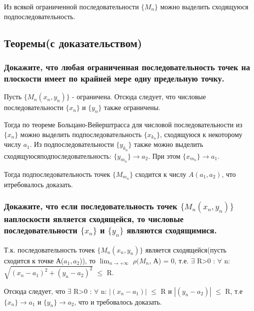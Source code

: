 \documentclass[a4paper, 12pt]{article}
\def\newline{}%
\begin{document}
            Из всякой ограниченной последовательности $\{M_n\}$ можно выделить сходящуюся\newline
            подпоследовательность.
        \subsection{Теоремы(с доказательством)}
            \subsubsection{Докажите, что любая ограниченная последовательность точек на плоскости
            имеет по крайней мере одну предельную точку.}

            Пусть $\{M_n(x_n, y_n)\}$ - ограничена. Отсюда следует, что числовые последовательности $\{x_n\}$ и 
            $\{y_n\}$ также ограничены.

            Тогда по теореме Больцано-Вейерштрасса для числовой последовательности из\newline $\{x_n\}$ можно выделить
            подпоследовательность $\{x_{k_n}\}$, сходящуюся к некоторому числу $a_1$. Из подпоследовательности
            $\{y_{k_n}\}$ также можно выделить сходящуюся\newline подпоследовательность: $\{y_{m_n}\} \rightarrow a_2$.
            При этом $\{x_{m_n}\} \rightarrow a_1$.

            Тогда подпоследовательность точек $\{M_{m_n}\}$ сходится к числу $A(a_1, a_2)$, что и\newline требовалось доказать.

            \subsubsection{Докажите, что если последовательность точек \texorpdfstring{$\{M_n(x_n, y_n)\}$}{Lg}
            на\newline плоскости является сходящейся, то числовые последовательности \texorpdfstring{$\{x_n\}$}{Lg}
            и \texorpdfstring{$\{y_n\}$}{Lg} являются сходящимися.}

            Т.к. последовательность точек $\{M_n(x_n, y_n)\}$ является сходящейся(пусть сходится к точке А($a_1, a_2$)), то \newline
            $\displaystyle{\lim_{n \to +\infty}}$ $\rho(M_n$, А) = 0, т.е. $\exists$ R>0 : $\forall$ n:$\sqrt{(x_n - a_1)^2 + (y_n - a_2)^2}$ $\leq$ R.
            
            Отсюда следует, что  $\exists$ R>0 : $\forall$ n: $|(x_n - a_1)|$ $\leq$ R и $|(y_n - a_2)|$ $\leq$ R,
            т.е $\{x_n\} \rightarrow a_1$ и $\{y_n\} \rightarrow a_2$, что и требовалось доказать.
\end{document}
